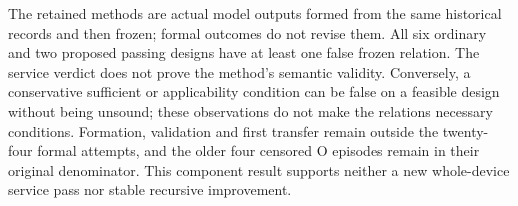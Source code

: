 The retained methods are actual model outputs formed from the same historical
records and then frozen; formal outcomes do not revise them. All six ordinary
and two proposed passing designs have at least one false frozen relation.
The service verdict does not prove the method's semantic validity. Conversely,
a conservative sufficient or applicability condition can be false on a feasible
design without being unsound; these observations do not make the relations
necessary conditions. Formation, validation and first transfer remain outside
the twenty-four formal attempts, and the older four censored O episodes remain
in their original denominator. This component result supports neither a new
whole-device service pass nor stable recursive improvement.
\FloatBarrier
